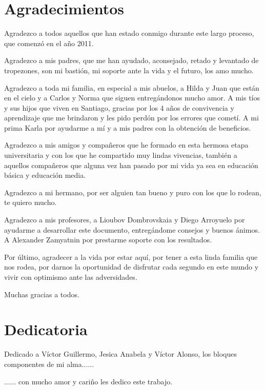 \chapter*{Agradecimientos}

Agradezco a todos aquellos que han estado conmigo durante este largo proceso, que comenzó en el año 2011.

Agradezco a mis padres, que me han ayudado, aconsejado, retado y levantado de tropezones, son mi bastión, mi soporte ante la vida y el futuro, los amo mucho.

Agradezco a toda mi familia, en especial a mis abuelos, a Hilda y Juan que están en el cielo y a Carlos y Norma que siguen entregándonos mucho amor. A mis tíos y sus hijos que viven en Santiago, gracias por los 4 años de convivencia y aprendizaje que me brindaron y les pido perdón por los errores que cometí. A mi prima Karla por ayudarme a mí y a mis padres con la obtención de beneficios.

Agradezco a mis amigos y compañeros que he formado en esta hermosa etapa universitaria y con los que he compartido muy lindas vivencias, también a aquellos compañeros que alguna vez han pasado por mi vida ya sea en educación básica y educación media.

Agradezco a mi hermano, por ser alguien tan bueno y puro con los que lo rodean, te quiero mucho.

Agradezco a mis profesores, a Lioubov Dombrovskaia y Diego Arroyuelo por ayudarme a desarrollar este documento, entregándome consejos y buenos ánimos. A Alexander Zamyatnin por prestarme soporte con los resultados.

Por último, agradecer a la vida por estar aquí, por tener a esta linda familia que nos rodea, por darnos la oportunidad de disfrutar cada segundo en este mundo y vivir con optimismo ante las adversidades. 

Muchas gracias a todos.
\newpage

\chapter*{Dedicatoria}

Dedicado a Víctor Guillermo, Jesica Anabela y Víctor Alonso, los bloques componentes de mi alma......

...... con mucho amor y cariño les dedico este trabajo.